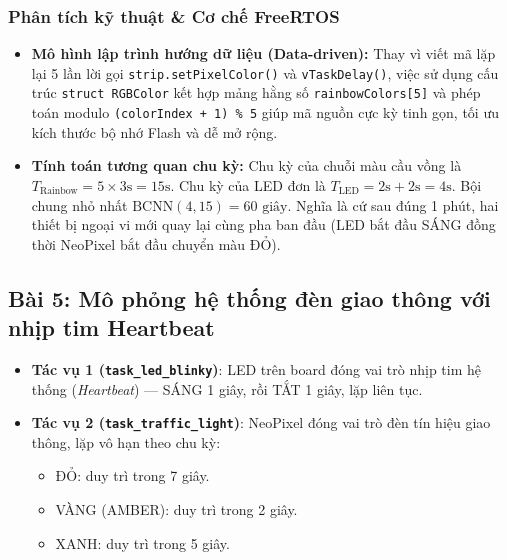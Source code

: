 \subsubsection{Phân tích kỹ thuật \& Cơ chế FreeRTOS}
\begin{itemize}
    \item \textbf{Mô hình lập trình hướng dữ liệu (Data-driven):} Thay vì viết mã lặp lại 5 lần lời gọi \texttt{strip.setPixelColor()} và \texttt{vTaskDelay()}, việc sử dụng cấu trúc \texttt{struct RGBColor} kết hợp mảng hằng số \texttt{rainbowColors[5]} và phép toán modulo \texttt{(colorIndex + 1) \% 5} giúp mã nguồn cực kỳ tinh gọn, tối ưu kích thước bộ nhớ Flash và dễ mở rộng.
    \item \textbf{Tính toán tương quan chu kỳ:} Chu kỳ của chuỗi màu cầu vồng là $T_{\text{Rainbow}} = 5 \times 3\text{s} = 15\text{s}$. Chu kỳ của LED đơn là $T_{\text{LED}} = 2\text{s} + 2\text{s} = 4\text{s}$. Bội chung nhỏ nhất $\text{BCNN}(4, 15) = 60\text{ giây}$. Nghĩa là cứ sau đúng 1 phút, hai thiết bị ngoại vi mới quay lại cùng pha ban đầu (LED bắt đầu SÁNG đồng thời NeoPixel bắt đầu chuyển màu ĐỎ).
\end{itemize}

\newpage
\subsection{Bài 5: Mô phỏng hệ thống đèn giao thông với nhịp tim Heartbeat}

\begin{tcolorbox}[
    enhanced, colback=black!2, colframe=black!60, boxrule=1pt, arc=2.5mm, drop shadow,
    attach boxed title to top left={xshift=4mm, yshift=-3mm},
    boxed title style={enhanced, colback=black!85, colframe=black!85, boxrule=1pt, arc=2.5mm, drop shadow, left=6pt, right=6pt, top=2pt, bottom=2pt},
    title=\textcolor{white}{\large\textbf{Yêu cầu đề bài (Trích phiếu bài tập)}}
]
\bfseries
\vspace{0.2cm}
\begin{itemize}
    \item \textbf{Tác vụ 1 (\texttt{task\_led\_blinky})}: LED trên board đóng vai trò nhịp tim hệ thống (\textit{Heartbeat}) — SÁNG 1 giây, rồi TẮT 1 giây, lặp liên tục.
    \item \textbf{Tác vụ 2 (\texttt{task\_traffic\_light})}: NeoPixel đóng vai trò đèn tín hiệu giao thông, lặp vô hạn theo chu kỳ:
    \begin{itemize}
        \item ĐỎ: duy trì trong 7 giây.
        \item VÀNG (AMBER): duy trì trong 2 giây.
        \item XANH: duy trì trong 5 giây.
    \end{itemize}
\end{itemize}
\end{tcolorbox}

